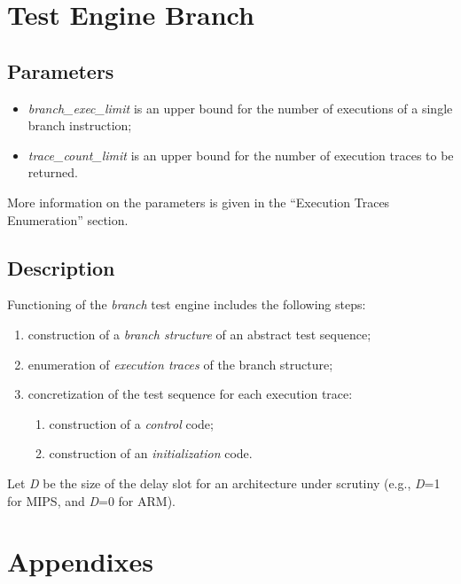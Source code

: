 \documentclass[oneside,final,12pt]{extreport}
\begin{document}
\chapter{Test Engine Branch}

\section{Parameters}

\begin{itemize}
\item \emph{branch{\_}exec{\_}limit} is an upper bound for the number of executions of a single branch instruction;
\item \emph{trace{\_}count{\_}limit} is an upper bound for the number of execution traces to be returned.
\end{itemize}

More information on the parameters is given in the “Execution Traces Enumeration” section.

\section{Description}

Functioning of the \emph{branch} test engine includes the following steps:

\begin{enumerate}
  \item construction of a \emph{branch structure} of an abstract test sequence;
  \item enumeration of \emph{execution traces} of the branch structure;
  \item concretization of the test sequence for each execution trace:
  \begin{enumerate}
    \item construction of a \emph{control} code;
    \item construction of an \emph{initialization} code.
  \end{enumerate}
\end{enumerate}

Let \emph{D} be the size of the delay slot for an architecture under scrutiny (e.g., \emph{D}=1
for MIPS, and \emph{D}=0 for ARM).


\chapter{Appendixes}
\end{document}
